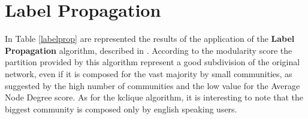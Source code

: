     \begin{table}[H]
        \centering
        \begin{subtable}{\textwidth}
        \end{subtable}
        \caption{Evaluation of the partitions obtained by the application of the K-Clique algorithm.}
        \label{kclique}
    \end{table}


\section{Label Propagation} %
\label{sec:label_propagation}
    In Table \ref{labelprop} are represented the results of the application of the \textbf{Label Propagation}
    algorithm, described in \cite{label_propagation}. According to the modularity score the partition provided by
    this algorithm represent a good subdivision of the original network, even if it is composed for the vast
    majority by small communities, as suggested by the high number of communities and the low value for the
    Average Node Degree score. As for the kclique algorithm, it is interesting to note that the biggest community
    is composed only by english speaking users.

